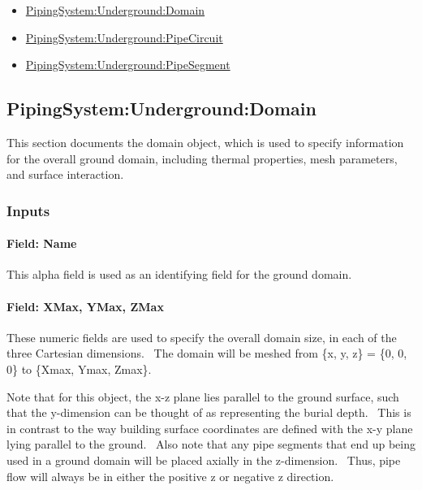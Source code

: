 \begin{itemize}
\item
  \hyperref[pipingsystemundergrounddomain]{PipingSystem:Underground:Domain}
\item
  \hyperref[pipingsystemundergroundpipecircuit]{PipingSystem:Underground:PipeCircuit}
\item
  \hyperref[pipingsystemundergroundpipesegment]{PipingSystem:Underground:PipeSegment}
\end{itemize}

\subsection{PipingSystem:Underground:Domain}\label{pipingsystemundergrounddomain}

This section documents the domain object, which is used to specify information for the overall ground domain, including thermal properties, mesh parameters, and surface interaction.

\subsubsection{Inputs}\label{inputs-9-011}

\paragraph{Field: Name}\label{field-name-9-010}

This alpha field is used as an identifying field for the ground domain.

\paragraph{Field: XMax, YMax, ZMax}\label{field-xmax-ymax-zmax}

These numeric fields are used to specify the overall domain size, in each of the three Cartesian dimensions.~ The domain will be meshed from \{x, y, z\} = \{0, 0, 0\} to \{Xmax, Ymax, Zmax\}.

Note that for this object, the x-z plane lies parallel to the ground surface, such that the y-dimension can be thought of as representing the burial depth.~ This is in contrast to the way building surface coordinates are defined with the x-y plane lying parallel to the ground.~ Also note that any pipe segments that end up being used in a ground domain will be placed axially in the z-dimension.~ Thus, pipe flow will always be in either the positive z or negative z direction.

